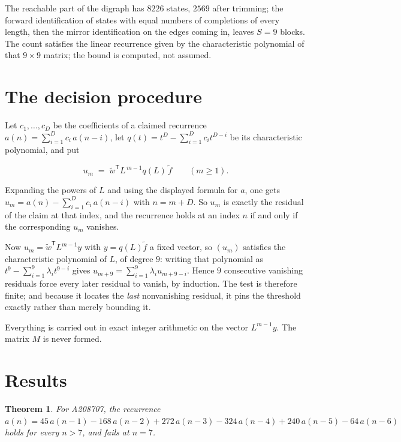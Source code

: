 \documentclass[11pt]{article}
\newtheorem{theorem}{Theorem}
\theoremstyle{definition}
\begin{document}
The reachable part of the digraph has $8226$ states, $2569$ after trimming; the forward identification of states with equal numbers of completions of every length, then the mirror identification on the edges coming in, leaves $S = 9$ blocks. The count satisfies the linear recurrence given by the characteristic polynomial of that $9\times9$ matrix; the bound is computed, not assumed.

\section{The decision procedure}

Let $c_1,\dots,c_D$ be the coefficients of a claimed recurrence $a(n) = \sum_{i=1}^{D} c_i\,a(n-i)$, let $q(t) = t^{D} - \sum_{i=1}^{D} c_i t^{D-i}$ be its characteristic polynomial, and put

\[u_m \;=\; \tilde w^{\mathsf T} L^{\,m-1} q(L)\,\tilde f \qquad (m \ge 1).\]

Expanding the powers of $L$ and using the displayed formula for $a$, one gets $u_m = a(n) - \sum_{i=1}^{D} c_i\,a(n-i)$ with $n = m + D$. So $u_m$ is exactly the residual of the claim at that index, and the recurrence holds at an index $n$ if and only if the corresponding $u_m$ vanishes.

Now $u_m = \tilde w^{\mathsf T} L^{m-1} y$ with $y = q(L)\tilde f$ a fixed vector, so $(u_m)$ satisfies the characteristic polynomial of $L$, of degree $9$: writing that polynomial as $t^{9} - \sum_{i=1}^{9} \lambda_i t^{9-i}$ gives $u_{m+9} = \sum_{i=1}^{9} \lambda_i u_{m+9-i}$. Hence $9$ consecutive vanishing residuals force every later residual to vanish, by induction. The test is therefore finite; and because it locates the {\itshape last} nonvanishing residual, it pins the threshold exactly rather than merely bounding it.

Everything is carried out in exact integer arithmetic on the vector $L^{m-1}y$. The matrix $M$ is never formed.

\section{Results}

\begin{theorem} For A208707, the recurrence $a(n) = 45\,a(n-1) - 168\,a(n-2) + 272\,a(n-3) - 324\,a(n-4) + 240\,a(n-5) - 64\,a(n-6)$ holds for every $n > 7$, and fails at $n = 7$.\end{theorem}
\end{document}
